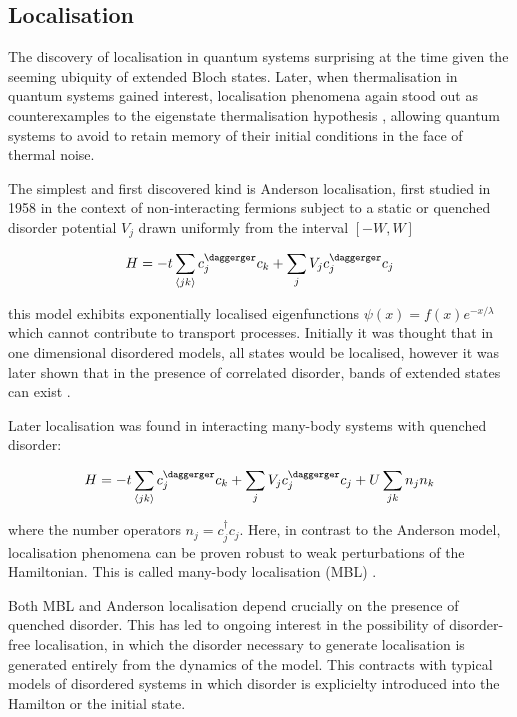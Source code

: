 \hypertarget{localisation}{%
\subsection{Localisation}\label{localisation}}

The discovery of localisation in quantum systems surprising at the time given the seeming ubiquity of extended Bloch states. Later, when thermalisation in quantum systems gained interest, localisation phenomena again stood out as counterexamples to the eigenstate thermalisation hypothesis \autocite{abaninRecentProgressManybody2017,srednickiChaosQuantumThermalization1994}, allowing quantum systems to avoid to retain memory of their initial conditions in the face of thermal noise.

The simplest and first discovered kind is Anderson localisation, first studied in 1958 \autocite{andersonAbsenceDiffusionCertain1958} in the context of non-interacting fermions subject to a static or quenched disorder potential \(V_j\) drawn uniformly from the interval \([-W,W]\)

\[
H = -t\sum_{\langle jk \rangle} c^\daggerger_j c_k + \sum_j V_j c_j^\daggerger c_j
\]

this model exhibits exponentially localised eigenfunctions \(\psi(x) = f(x) e^{-x/\lambda}\) which cannot contribute to transport processes. Initially it was thought that in one dimensional disordered models, all states would be localised, however it was later shown that in the presence of correlated disorder, bands of extended states can exist \autocite{izrailevLocalizationMobilityEdge1999,croyAndersonLocalization1D2011,izrailevAnomalousLocalizationLowDimensional2012}.

Later localisation was found in interacting many-body systems with quenched disorder:

\[
H = -t\sum_{\langle jk \rangle} c^\daggerger_j c_k + \sum_j V_j c_j^\daggerger c_j + U\sum_{jk} n_j n_k
\]

where the number operators \(n_j = c^\dagger_j c_j\). Here, in contrast to the Anderson model, localisation phenomena can be proven robust to weak perturbations of the Hamiltonian. This is called many-body localisation (MBL) \autocite{imbrieManyBodyLocalizationQuantum2016}.

Both MBL and Anderson localisation depend crucially on the presence of quenched disorder. This has led to ongoing interest in the possibility of disorder-free localisation, in which the disorder necessary to generate localisation is generated entirely from the dynamics of the model. This contracts with typical models of disordered systems in which disorder is explicielty introduced into the Hamilton or the initial state.

